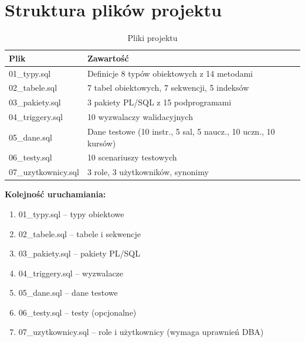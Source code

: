 \documentclass[12pt,a4paper]{article}
\begin{document}
\section{Struktura plików projektu}

\begin{table}[h]
\centering
\begin{tabular}{|l|p{9cm}|}
\hline
\textbf{Plik} & \textbf{Zawartość} \\
\hline
01\_typy.sql & Definicje 8 typów obiektowych z 14 metodami \\
02\_tabele.sql & 7 tabel obiektowych, 7 sekwencji, 5 indeksów \\
03\_pakiety.sql & 3 pakiety PL/SQL z 15 podprogramami \\
04\_triggery.sql & 10 wyzwalaczy walidacyjnych \\
05\_dane.sql & Dane testowe (10 instr., 5 sal, 5 naucz., 10 uczn., 10 kursów) \\
06\_testy.sql & 10 scenariuszy testowych \\
07\_uzytkownicy.sql & 3 role, 3 użytkowników, synonimy \\
\hline
\end{tabular}
\caption{Pliki projektu}
\end{table}

\textbf{Kolejność uruchamiania:}
\begin{enumerate}[nosep]
    \item 01\_typy.sql -- typy obiektowe
    \item 02\_tabele.sql -- tabele i sekwencje
    \item 03\_pakiety.sql -- pakiety PL/SQL
    \item 04\_triggery.sql -- wyzwalacze
    \item 05\_dane.sql -- dane testowe
    \item 06\_testy.sql -- testy (opcjonalne)
    \item 07\_uzytkownicy.sql -- role i użytkownicy (wymaga uprawnień DBA)
\end{enumerate}
\end{document}
